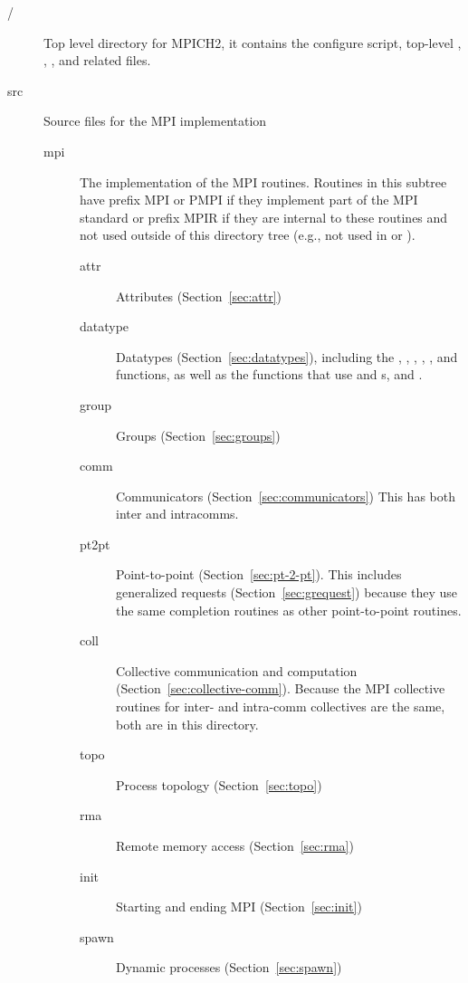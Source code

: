 \documentclass{article}
\begin{document}
\begin{description}
\item[/]Top level directory for MPICH2, it contains the configure script,
  top-level , , , and related
  files. 
\item[src]Source files for the MPI implementation
  \begin{description}
  \item[mpi]The implementation of the MPI routines.  Routines in this
    subtree have prefix MPI or PMPI if they implement part of the MPI
    standard or prefix MPIR if they are internal to these routines and
    not used outside of this directory tree (e.g., not used in
     or ).
    \begin{description}
    \item[attr]Attributes (Section~\ref{sec:attr})
    \item[datatype]Datatypes (Section~\ref{sec:datatypes}), including the
      , , ,
      , , and
       functions, as well as the functions
      that use  and s,
       and .  
    \item[group]Groups (Section~\ref{sec:groups})
    \item[comm]Communicators (Section~\ref{sec:communicators})
      This has both inter and intracomms.
    \item[pt2pt]Point-to-point (Section~\ref{sec:pt-2-pt}).  This
    includes generalized requests (Section~\ref{sec:grequest}) because
    they use the same completion  
    routines as other point-to-point routines.
    \item[coll]Collective communication and computation
      (Section~\ref{sec:collective-comm}).  Because the MPI collective
      routines for inter- and intra-comm collectives are the same,
      both are in this directory.
    \item[topo]Process topology (Section~\ref{sec:topo})
    \item[rma]Remote memory access (Section~\ref{sec:rma})
    \item[init]Starting and ending MPI (Section~\ref{sec:init})
    \item[spawn]Dynamic processes (Section~\ref{sec:spawn})

\end{description}
\end{description}
\end{description}
\end{document}
